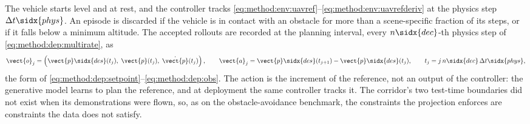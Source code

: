 The vehicle starts level and at rest, and the controller tracks
\eqref{eq:method:env:uavref}--\eqref{eq:method:env:uavrefderiv} at the physics step $\Delta t\sidx{phys}$.
An episode is discarded if the vehicle is in contact with an obstacle for more than a scene-specific
fraction of its steps, or if it falls below a minimum altitude. The accepted rollouts are recorded at the
planning interval, every $n\sidx{dec}$-th physics step of \eqref{eq:method:dep:multirate}, as
\begin{equation}\label{eq:method:env:uavdata}
  \vect{o}_{j} = \left(\vect{p}\sidx{des}(t_{j}),\;\vect{p}(t_{j}),\;\dot{\vect{p}}(t_{j})\right),
  \qquad
  \vect{a}_{j} = \vect{p}\sidx{des}(t_{j+1}) - \vect{p}\sidx{des}(t_{j}),
  \qquad
  t_{j} = j\,n\sidx{dec}\,\Delta t\sidx{phys},
\end{equation}
the form of \eqref{eq:method:dep:setpoint}--\eqref{eq:method:dep:obs}. The action is the increment of
the reference, not an output of the controller: the generative model learns to plan the reference,
and at deployment the same controller tracks it. The corridor's two test-time boundaries did not exist
when its demonstrations were flown, so, as on the obstacle-avoidance benchmark, the constraints the
projection enforces are constraints the data does not satisfy.
